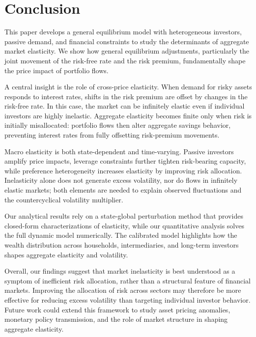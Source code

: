 
\section{Conclusion}

This paper develops a general equilibrium model with heterogeneous investors, passive demand, and financial constraints to study the determinants of aggregate market elasticity.
We show how general equilibrium adjustments, particularly the joint movement of the risk-free rate and the risk premium, fundamentally shape the price impact of portfolio flows.  

A central insight is the role of cross-price elasticity.
When demand for risky assets responds to interest rates, shifts in the risk premium are offset by changes in the risk-free rate.
In this case, the market can be infinitely elastic even if individual investors are highly inelastic.
Aggregate elasticity becomes finite only when risk is initially misallocated: portfolio flows then alter aggregate savings behavior, preventing interest rates from fully offsetting risk-premium movements.  

Macro elasticity is both state-dependent and time-varying.
Passive investors amplify price impacts, leverage constraints further tighten risk-bearing capacity, while preference heterogeneity increases elasticity by improving risk allocation.
Inelasticity alone does not generate excess volatility, nor do flows in infinitely elastic markets; both elements are needed to explain observed fluctuations and the countercyclical volatility multiplier.  

Our analytical results rely on a state-global perturbation method that provides closed-form characterizations of elasticity, while our quantitative analysis solves the full dynamic model numerically.
The calibrated model highlights how the wealth distribution across households, intermediaries, and long-term investors shapes aggregate elasticity and volatility.  

Overall, our findings suggest that market inelasticity is best understood as a symptom of inefficient risk allocation, rather than a structural feature of financial markets.
Improving the allocation of risk across sectors may therefore be more effective for reducing excess volatility than targeting individual investor behavior.
Future work could extend this framework to study asset pricing anomalies, monetary policy transmission, and the role of market structure in shaping aggregate elasticity.
